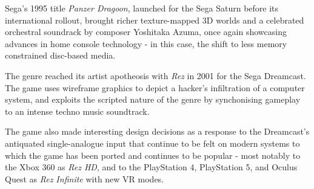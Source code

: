 \documentclass[11pt]{article}
\begin{document}
Sega's 1995 title \textit{Panzer Dragoon}\cite{panzer_dragoon}, launched for the Sega Saturn before its international
rollout, brought richer texture-mapped 3D worlds and a celebrated orchestral soundrack by composer
Yoshitaka Azuma, once again showcasing advances in home console technology - in this case, the
shift to less memory constrained disc-based media.

The genre reached its artist apotheosis with \textit{Rez}\cite{rez} in 2001 for the Sega Dreamcast.
The game uses wireframe graphics to depict a hacker's infiltration of a computer system, and exploits the
scripted nature of the genre by synchonising gameplay to an intense techno music soundtrack.

The game also made interesting design decisions as a response to the Dreamcast's antiquated
single-analogue input that continue to be felt on modern systems to which the game has been ported and
continues to be popular - most notably to the Xbox 360 as \textit{Rez HD}, and to the PlayStation 4,
PlayStation 5, and Oculus Quest as \textit{Rez Infinite} with new VR modes.
\end{document}
